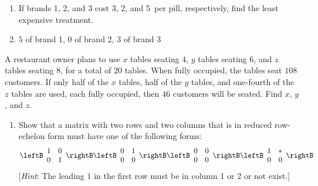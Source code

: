 \begin{multicols}{2}
\begin{supex}
\begin{enumerate}[label={\alph*.}]
\item If brands 1, 2, and 3 cost 3\textcent, 2\textcent, and 5\textcent \ per pill, respectively, find the least expensive treatment.

\end{enumerate}
\begin{supsol}
\begin{enumerate}[label={\alph*.}]
\setcounter{enumi}{1}
\item  $5$ of brand 1, $0$ of brand 2, $3$ of brand 3

\end{enumerate}
\end{supsol}
\end{supex}

\begin{supex}
A restaurant owner plans to use $x$ tables seating $4$, $y$ tables seating $6$, and $z$ tables seating $8$, for a total of $20$ tables. When fully occupied, the tables seat $108$ customers. If only half of the $x$ tables, half of the $y$ tables, and one-fourth of the $z$ tables are used, each fully occupied, then $46$ customers will be seated. Find $x$, $y$, and $z$.

\end{supex}

\begin{supex}

\begin{enumerate}[label={\alph*.}]
\item Show that a matrix with two rows and two columns that is in reduced row-echelon form must have one of the following forms:
\begin{equation*}
\leftB \begin{array}{rr}
1 & 0 \\
0 & 1
\end{array} \rightB
\leftB \begin{array}{rr}
0 & 1 \\
0 & 0
\end{array} \rightB
\leftB \begin{array}{rr}
0 & 0 \\
0 & 0
\end{array} \rightB
\leftB \begin{array}{rr}
1 & * \\
0 & 0
\end{array} \rightB
\end{equation*}
[\textit{Hint}: The leading $1$ in the first row must be in column 1 or 2 or not exist.]


\end{enumerate}
\end{supex}
\end{multicols}
